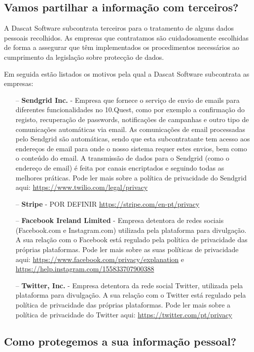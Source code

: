 \subsection{Vamos partilhar a informação com terceiros?}

A Dascat Software subcontrata terceiros para o tratamento de alguns dados pessoais recolhidos. As empresas que contratamos são cuidadosamente escolhidas de forma a assegurar que têm implementados os procedimentos necessários ao cumprimento da legislação sobre protecção de dados.

Em seguida estão listados os motivos pela qual a Dascat Software subcontrata as empresas:

\begin{itemize}
	\item[--] \textbf{Sendgrid Inc.} - Empresa que fornece o serviço de envio de emails para diferentes funcionalidades no 10.Quest, como por exemplo a confirmação do registo, recuperação de passwords, notificações de campanhas e outro tipo de comunicações automáticas via email. As comunicações de email processadas pelo Sendgrid são automáticas, sendo que esta subcontratante tem acesso aos endereços de email para onde o nosso sistema requer estes envios, bem como o conteúdo do email. A transmissão de dados para o Sendgrid (como o endereço de email) é feita por canais encriptados e seguindo todas as melhores práticas. Pode ler mais sobre a política de privacidade do Sendgrid aqui: \url{https://www.twilio.com/legal/privacy}
	\item[--] \textbf{Stripe} - POR DEFINIR \url{https://stripe.com/en-pt/privacy}
	\item[--] \textbf{Facebook Ireland Limited} - Empresa detentora de redes sociais (Facebook.com e Instagram.com) utilizada pela plataforma para divulgação. A sua relação com o Facebook está regulado pela política de privacidade das próprias plataformas. Pode ler mais sobre as suas políticas de privacidade aqui: \url{https://www.facebook.com/privacy/explanation} e \url{https://help.instagram.com/155833707900388}
	\item[--] \textbf{Twitter, Inc.} - Empresa detentora da rede social Twitter, utilizada pela plataforma para divulgação. A sua relação com o Twitter está regulado pela política de privacidade das próprias plataformas. Pode ler mais sobre a política de privacidade do Twitter aqui: \url{https://twitter.com/pt/privacy}
\end{itemize}

\subsection{Como protegemos a sua informação pessoal?}


